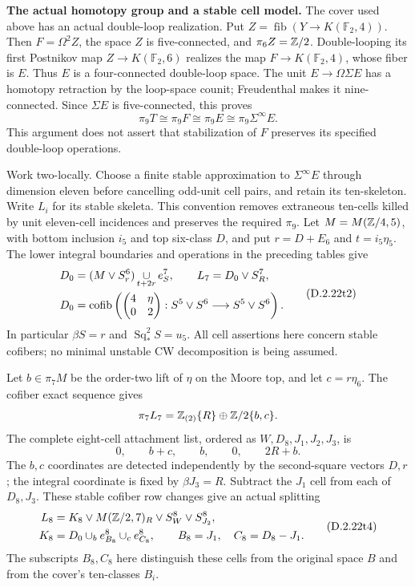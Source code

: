 \medskip\noindent
\textbf{The actual homotopy group and a stable cell model.}
The cover used above has an actual double-loop realization.
Put $Z=\operatorname{fib}(Y\to K(\mathbb F _2,4))$.
Then $F=\Omega^2Z$, the space $Z$ is five-connected, and
$\pi_6Z=\mathbb Z/2$.  Double-looping its first Postnikov map
$Z\to K(\mathbb F _2,6)$ realizes the map
$F\to K(\mathbb F _2,4)$, whose fiber is $E$.
Thus $E$ is a four-connected double-loop space.
The unit $E\to\Omega\Sigma E$ has a homotopy retraction by
the loop-space counit; Freudenthal makes it nine-connected.
Since $\Sigma E$ is five-connected, this proves
\[
 \pi_9T\cong\pi_9F\cong\pi_9E
       \cong\pi_9\Sigma^\infty E.
 \tag{D.2.22t1}
\]
This argument does not assert that stabilization of $F$ preserves
its specified double-loop operations.

Work two-locally.  Choose a finite stable approximation to
$\Sigma^\infty E$ through dimension eleven before cancelling
odd-unit cell pairs, and retain its ten-skeleton.
Write $L_i$ for its stable skeleta.  This convention removes
extraneous ten-cells killed by unit eleven-cell incidences and
preserves the required $\pi_9$.
Let $M=M(\mathbb Z/4,5)$, with bottom inclusion $i_5$ and top
six-class $D$, and put $r=D+E_6$ and $t=i_5\eta_5$.
The lower integral boundaries and operations in the preceding
tables give
\[
 \begin{split}
 D_0&=(M\vee S^6_r)\mathop{\cup}_{t+2r}e^7_S,
       \qquad L_7=D_0\vee S^7_R,\\
 D_0&=\operatorname{cofib}\left(
 \begin{pmatrix}4&\eta\\0&2\end{pmatrix}:
 S^5\vee S^6\longrightarrow S^5\vee S^6\right).
 \end{split}
 \tag{D.2.22t2}
\]
In particular $\beta S=r$ and $\operatorname{Sq}_*^2S=u_5$.
All cell assertions here concern stable cofibers; no minimal
unstable CW decomposition is being assumed.

Let $b\in\pi_7M$ be the order-two lift of $\eta$ on the
Moore top, and let $c=r\eta_6$.
The cofiber exact sequence gives
\[
 \pi_7L_7=\mathbb Z_{(2)}\{R\}\oplus
                    \mathbb Z/2\{b,c\}.
\]
The complete eight-cell attachment list, ordered as
$W,D_8,J_1,J_2,J_3$, is
\[
 0,\qquad b+c,\qquad b,\qquad0,\qquad2R+b.
 \tag{D.2.22t3}
\]
The $b,c$ coordinates are detected independently by the
second-square vectors $D,r$; the integral coordinate is fixed
by $\beta J_3=R$.
Subtract the $J_1$ cell from each of $D_8,J_3$.
These stable cofiber row changes give an actual splitting
\[
 \begin{split}
 L_8&=K_8\vee M(\mathbb Z/2,7)_R\vee S^8_W\vee S^8_{J_2},\\
 K_8&=D_0\cup_b e^8_{B_8}\cup_c e^8_{C_8},
       \qquad B_8=J_1,\quad C_8=D_8-J_1.
 \end{split}
 \tag{D.2.22t4}
\]
The subscripts $B_8,C_8$ here distinguish these cells from
the original space $B$ and from the cover's ten-classes $B_i$.

